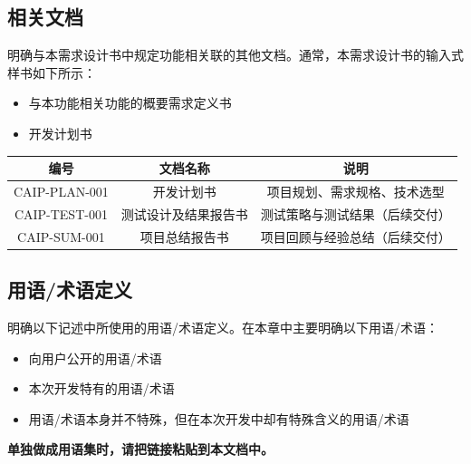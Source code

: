 \documentclass[12pt,a4paper]{ctexart}
\numberwithin{figure}{section}
\numberwithin{table}{section}
\begin{document}
\subsection{相关文档}

明确与本需求设计书中规定功能相关联的其他文档。通常，本需求设计书的输入式样书如下所示：

\begin{itemize}
    \item 与本功能相关功能的概要需求定义书
    \item 开发计划书
\end{itemize}

\begin{center}
\renewcommand{\arraystretch}{1.3}
\begin{tabular}{|c|c|c|}
\hline
\rowcolor{tableheader}
\textbf{编号} & \textbf{文档名称} & \textbf{说明} \\
\hline
CAIP-PLAN-001 & 开发计划书 & 项目规划、需求规格、技术选型 \\
\hline
CAIP-TEST-001 & 测试设计及结果报告书 & 测试策略与测试结果（后续交付） \\
\hline
CAIP-SUM-001 & 项目总结报告书 & 项目回顾与经验总结（后续交付） \\
\hline
\end{tabular}
\end{center}

\subsection{用语/术语定义}

明确以下记述中所使用的用语/术语定义。在本章中主要明确以下用语/术语：

\begin{itemize}
    \item 向用户公开的用语/术语
    \item 本次开发特有的用语/术语
    \item 用语/术语本身并不特殊，但在本次开发中却有特殊含义的用语/术语
\end{itemize}

\textbf{单独做成用语集时，请把链接粘贴到本文档中。}
\end{document}
